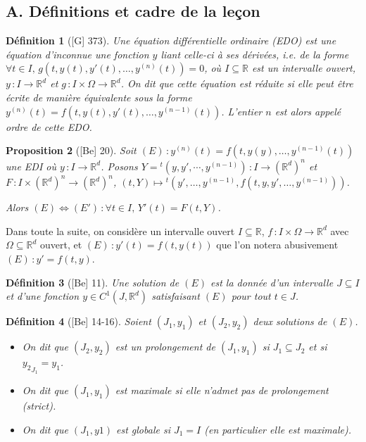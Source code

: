 \documentclass[10pt, a4paper, parskip=full, twoside, twocolumn]{report}
\newtheorem{definition}{Définition}
\newtheorem{proposition}[definition]{Proposition}
\newcommand{\IR}{\mathbb{R}}
\begin{document}
\subsection*{A. Définitions et cadre de la leçon}

\begin{definition}[\textnormal{[G] 373}]
	Une \emph{équation différentielle ordinaire} (EDO) est une équation d'inconnue une fonction $y$ liant celle-ci à ses dérivées, \emph{i.e.} de la forme $\forall t\in I,\, g(t,y(t),y'(t),\dots, y^{(n)}(t)) = 0$,
	où $I\subseteq \IR$ est un intervalle ouvert, $y\,\colon I\to\IR^d$ et $g\,\colon I\times\Omega\to\IR^d$.
	On dit que cette équation est \emph{réduite} si elle peut être écrite de manière équivalente sous la forme $y^{(n)}(t) = f(t,y(t),y'(t),\dots,y^{(n-1)}(t))$.
	L'entier $n$ est alors appelé \emph{ordre} de cette EDO.
\end{definition}

\begin{proposition}[\textnormal{[Be] 20}]
	Soit $(E)\,\colon y^{(n)}(t) = f(t,y(y),\dots,y^{(n-1)}(t))$ une EDI où $y \,\colon I\to \IR^d$.
	Posons $Y = {}^t(y, y', \cdots, y^{(n-1)})\,\colon I\to \left(\IR^d\right)^n$ 
	et $F\,\colon I\times \left(\IR^d\right)^n\to \left(\IR^d\right)^n$, 
	$(t,Y)\mapsto {}^t(y',\dots, y^{(n-1)},f(t,y,y',\dots,y^{(n-1)}))$.

	Alors $(E)\iff (E')\,\colon \forall t\in I,\, Y'(t) = F(t,Y)$.
\end{proposition}

\textcolor{paragraphtext}{Dans toute la suite, on considère un intervalle 
ouvert $I\subseteq \IR$, $f\,\colon I\times \Omega\to\IR^d$ avec $\Omega\subseteq \IR^d$ ouvert, et $(E)\,\colon y'(t) = f(t,y(t))$ que l'on notera abusivement $(E)\,\colon y'=f(t,y)$.}

\begin{definition}[\textnormal{[Be] 11}]
	Une \emph{solution de $(E)$} est la donnée d'un intervalle $J\subseteq I$ et d'une fonction $y\in C^1(J,\IR^d)$ satisfaisant $(E)$ pour tout $t\in J$.
\end{definition}

\begin{definition}[\textnormal{[Be] 14-16}]
	Soient $(J_1,y_1)$ et $(J_2,y_2)$ deux solutions de $(E)$.
	\begin{itemize}
		\item On dit que $(J_2,y_2)$ est un \emph{prolongement de $(J_1,y_1)$} si $J_1\subseteq J_2$ et si ${y_2}_{J_1} = y_1$.
		\item On dit que $(J_1, y_1)$ est \emph{maximale} si elle n'admet pas de prolongement (strict).
		\item On dit que $(J_1,y1)$ est \emph{globale} si $J_1 = I$ (en particulier elle est maximale).
	\end{itemize}
\end{definition}
\end{document}
